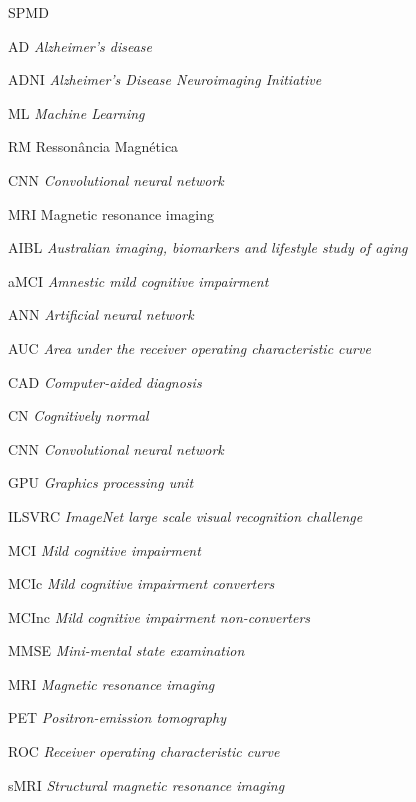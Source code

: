 \documentclass[openright]{UFRGS} %
\begin{document}
\begin{listofabbrv}{SPMD}
        \item[AD]  \textit{Alzheimer’s disease}
        \item[ADNI ]\textit{Alzheimer’s Disease Neuroimaging Initiative}
        \item[ML] \textit{Machine Learning}
        \item[RM] Ressonância Magnética
        \item[CNN] \textit{Convolutional neural network}
        \item[MRI] Magnetic resonance imaging
        \item[AIBL] \textit{Australian imaging, biomarkers and lifestyle study of aging}
        \item[aMCI] \textit{Amnestic mild cognitive impairment}
        \item[ANN]  \textit{Artificial neural network}
        \item[AUC]  \textit{Area under the receiver operating characteristic curve}
        \item[CAD] \textit{Computer-aided diagnosis}
        \item[CN] \textit{Cognitively normal}
        \item[CNN] \textit{Convolutional neural network}
        \item[GPU] \textit{Graphics processing unit}
        \item[ILSVRC] \textit{ImageNet large scale visual recognition challenge}
        \item[MCI] \textit{Mild cognitive impairment}
        \item[MCIc] \textit{Mild cognitive impairment converters}
        \item[MCInc] \textit{Mild cognitive impairment non-converters}
        \item[MMSE] \textit{Mini-mental state examination}
        \item[MRI] \textit{Magnetic resonance imaging}
        \item[PET] \textit{Positron-emission tomography}
        \item[ROC] \textit{Receiver operating characteristic curve}
        \item[sMRI] \textit{Structural magnetic resonance imaging}  
          
          
\end{listofabbrv}

\listoffigures
\end{document}
